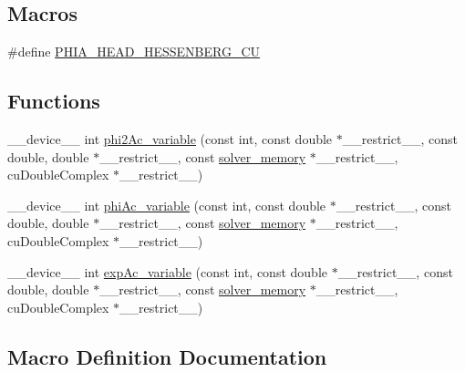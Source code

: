\subsection*{Macros}
\begin{DoxyCompactItemize}
\item 
\#define \hyperlink{phiAHessenberg_8cuh_a3cd1f20586504db36f26cc1dbe605dc1}{P\+H\+I\+A\+\_\+\+H\+E\+A\+D\+\_\+\+H\+E\+S\+S\+E\+N\+B\+E\+R\+G\+\_\+\+CU}
\end{DoxyCompactItemize}
\subsection*{Functions}
\begin{DoxyCompactItemize}
\item 
\+\_\+\+\_\+device\+\_\+\+\_\+ int \hyperlink{phiAHessenberg_8cuh_a6daaee3ff7b872cd3bf32bdfda84b68a}{phi2\+Ac\+\_\+variable} (const int, const double $\ast$\+\_\+\+\_\+restrict\+\_\+\+\_\+, const double, double $\ast$\+\_\+\+\_\+restrict\+\_\+\+\_\+, const \hyperlink{structsolver__memory}{solver\+\_\+memory} $\ast$\+\_\+\+\_\+restrict\+\_\+\+\_\+, cu\+Double\+Complex $\ast$\+\_\+\+\_\+restrict\+\_\+\+\_\+)
\item 
\+\_\+\+\_\+device\+\_\+\+\_\+ int \hyperlink{phiAHessenberg_8cuh_aa917e9051a8f04b5d7643b27e8367688}{phi\+Ac\+\_\+variable} (const int, const double $\ast$\+\_\+\+\_\+restrict\+\_\+\+\_\+, const double, double $\ast$\+\_\+\+\_\+restrict\+\_\+\+\_\+, const \hyperlink{structsolver__memory}{solver\+\_\+memory} $\ast$\+\_\+\+\_\+restrict\+\_\+\+\_\+, cu\+Double\+Complex $\ast$\+\_\+\+\_\+restrict\+\_\+\+\_\+)
\item 
\+\_\+\+\_\+device\+\_\+\+\_\+ int \hyperlink{phiAHessenberg_8cuh_ab94b849aefe94d752806790b9788247d}{exp\+Ac\+\_\+variable} (const int, const double $\ast$\+\_\+\+\_\+restrict\+\_\+\+\_\+, const double, double $\ast$\+\_\+\+\_\+restrict\+\_\+\+\_\+, const \hyperlink{structsolver__memory}{solver\+\_\+memory} $\ast$\+\_\+\+\_\+restrict\+\_\+\+\_\+, cu\+Double\+Complex $\ast$\+\_\+\+\_\+restrict\+\_\+\+\_\+)
\end{DoxyCompactItemize}


\subsection{Macro Definition Documentation}
